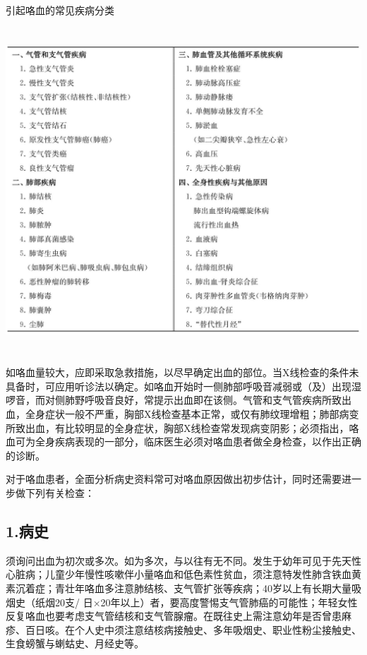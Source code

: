 \begin{table}[htbp]
\centering
\caption{引起咯血的常见疾病分类}
\label{tab4-2}
\includegraphics[width=5.89583in,height=4.80208in]{./images/Image00039.jpg}
\end{table}

如咯血量较大，应即采取急救措施，以尽早确定出血的部位。当X线检查的条件未具备时，可应用听诊法以确定。如咯血开始时一侧肺部呼吸音减弱或（及）出现湿啰音，而对侧肺野呼吸音良好，常提示出血即在该侧。气管和支气管疾病所致出血，全身症状一般不严重，胸部X线检查基本正常，或仅有肺纹理增粗；肺部病变所致出血，有比较明显的全身症状，胸部X线检查常发现病变阴影；必须指出，咯血可为全身疾病表现的一部分，临床医生必须对咯血患者做全身检查，以作出正确的诊断。

对于咯血患者，全面分析病史资料常可对咯血原因做出初步估计，同时还需要进一步做下列有关检查：

\subsection{1.病史}

须询问出血为初次或多次。如为多次，与以往有无不同。发生于幼年可见于先天性心脏病；儿童少年慢性咳嗽伴小量咯血和低色素性贫血，须注意特发性肺含铁血黄素沉着症；青壮年咯血多注意肺结核、支气管扩张等疾病；40岁以上有长期大量吸烟史（纸烟20支/
日×20年以上）者，要高度警惕支气管肺癌的可能性；年轻女性反复咯血也要考虑支气管结核和支气管腺瘤。在既往史上需注意幼年是否曾患麻疹、百日咳。在个人史中须注意结核病接触史、多年吸烟史、职业性粉尘接触史、生食螃蟹与蝲蛄史、月经史等。

